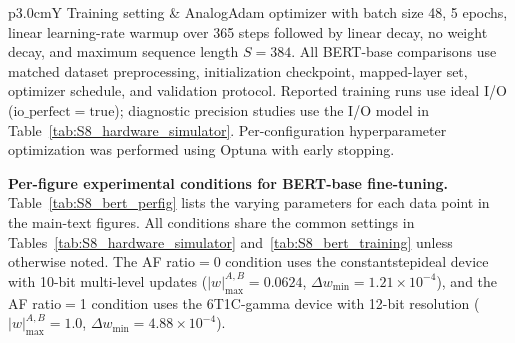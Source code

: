 \documentclass[AMA,LATO1COL]{WileyNJDv5}
\begin{document}
\begin{table}[H]
\begin{tabularx}{\linewidth}{p{3.0cm}Y}
\midrule
Training setting &
AnalogAdam optimizer with batch size 48, 5 epochs, linear learning-rate warmup over 365 steps followed by linear decay, no weight decay, and maximum sequence length \(S=384\). All BERT-base comparisons use matched dataset preprocessing, initialization checkpoint, mapped-layer set, optimizer schedule, and validation protocol. Reported training runs use ideal I/O (\(\mathrm{io\_perfect}=\mathrm{true}\)); diagnostic precision studies use the I/O model in Table~\ref{tab:S8_hardware_simulator}. Per-configuration hyperparameter optimization was performed using Optuna with early stopping. \\
\bottomrule
\end{tabularx}
\end{table}
\FloatBarrier

\noindent\textbf{Per-figure experimental conditions for BERT-base fine-tuning.}
Table~\ref{tab:S8_bert_perfig} lists the varying parameters for each data point in the main-text figures. All conditions share the common settings in Tables~\ref{tab:S8_hardware_simulator} and~\ref{tab:S8_bert_training} unless otherwise noted. The AF ratio\(=\)0 condition uses the constantstepideal device with 10-bit multi-level updates (\(|w|_{\max}^{A,B}=0.0624\), \(\Delta w_{\min}=1.21\times10^{-4}\)), and the AF ratio\(=\)1 condition uses the 6T1C-gamma device with 12-bit resolution (\(|w|_{\max}^{A,B}=1.0\), \(\Delta w_{\min}=4.88\times10^{-4}\)).
\end{document}
